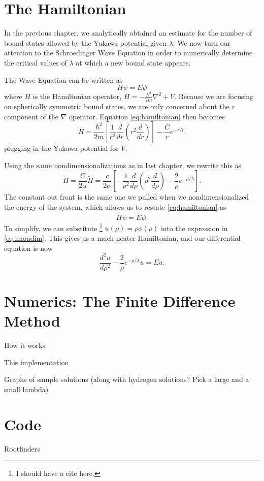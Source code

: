 \documentclass[12pt,twoside]{reedthesis}
\newcommand{\eqn}[1]{\begin{equation}#1\end{equation}}
\begin{document}
\section{The Hamiltonian}

In the previous chapter, we analytically obtained an estimate for the number of bound states allowed by the Yukawa potential given $\lambda$. We now turn our attention to the Schroedinger Wave Equation in order to numerically determine the critical values of $\lambda$ at which a new bound state appears. 

The Wave Equation can be written as
\eqn{
H \psi = E\psi
\label{eq:hamiltonian}
}
where $H$ is the Hamiltonian operator, $H =-\frac{\hbar^2}{2m}\nabla^2 +V$.  Because we are focusing on spherically symmetric bound states, we are only concerned about the $r$ component of the $\nabla$ operator. Equation \eqref{eq:hamiltonian} then becomes
\eqn{
H = \frac{\hbar^2}{2m} \left[\frac{1}{r^2}\frac{d}{dr}\left(r^2 \frac{d}{dr}\right)\right] - \frac{C}{r}e^{-r/l}\mbox{,}
}
plugging in the Yukawa potential for $V$.

Using the same nondimensionalizations as in last chapter, we rewrite this as 
\eqn{
H=\frac{C}{2\alpha}\tilde{H} = \frac{c}{2\alpha} \left[- \frac{1}{\rho^2}\frac{d}{d\rho}\left(\rho^2\frac{d}{d\rho}\right) - \frac{2}{\rho}e^{-\rho/\lambda}\right]\mbox{.}
\label{eq:hnondim}
}
The constant out front is the same one we pulled when we nondimensionalized the energy of the system, which allows us to restate \eqref{eq:hamiltonian} as
\eqn{
\tilde{H}\psi = \tilde{E}\psi\mbox{.}
}
To simplify, we can substitute \footnote{I should have a cite here.} $u(\rho)=\rho \phi(\rho)$ into the expression in \eqref{eq:hnondim}. This gives us a much neater Hamiltonian, and our differential equation is now
\eqn{
\frac{d^2 u }{d \rho^2} - \frac{2}{\rho}e^{-\rho/\lambda}u = E u\mbox{.}
\label{eq:hamiltonianfinal}
}

\section{Numerics: The Finite Difference Method}
How it works

This implementation

Graphs of sample solutions (along with hydrogen solutions? Pick a large and a small lambda)

\section{Code}
Rootfinders
\end{document}

